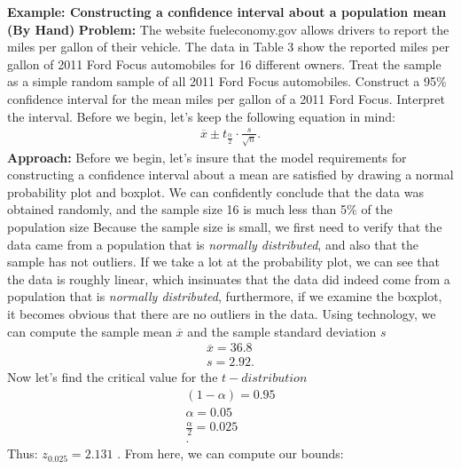 \documentclass{report}
\begin{document}
    \begin{mdframed}
      \textbf{Example: Constructing a confidence interval about a population mean (By Hand)}
      \bigbreak \noindent 
      \textbf{Problem:}
    The website fueleconomy.gov allows drivers to report the miles per gallon of their vehicle. The data in Table 3 show the reported miles per gallon of 2011 Ford Focus automobiles for 16 different owners. Treat the sample as a simple random sample of all 2011 Ford Focus automobiles. Construct a 95\% confidence interval for the mean miles per gallon of a 2011 Ford Focus. Interpret the interval.
      \bigbreak \noindent 
      Before we begin, let's keep the following equation in mind:
      \begin{align*}
          \overline{x} \pm t_{\frac{\alpha}{2}}\cdot \frac{s}{\sqrt{n}}
      .\end{align*}
      \bigbreak \noindent 
      \textbf{Approach:} Before we begin, let's insure that the model requirements for constructing a confidence interval about a mean are satisfied by drawing a normal probability plot and boxplot.
      \bigbreak \noindent 
      We can confidently conclude that the data was obtained randomly, and the sample size 16 is much less than 5\% of the population size
      \bigbreak \noindent 
      Because the sample size is small, we first need to verify that the data came from a population that is \textit{normally distributed}, and also that the sample has not outliers. If we take a lot at the probability plot, we can see that the data is roughly linear, which insinuates that the data did indeed come from a population that is \textit{normally distributed}, furthermore, if we examine the boxplot, it becomes obvious that there are no outliers in the data.
      \bigbreak \noindent 
      Using technology, we can compute the sample mean $\overline{x} $ and the sample standard deviation $s $
      \begin{align*}
          \overline{x} = 36.8 \\
           s = 2.92
      .\end{align*}
      \bigbreak \noindent 
      Now let's find the critical value for the $t-distribution$
      \begin{align*}
          (1-\alpha) = 0.95 \\
          \alpha = 0.05 \\
          \frac{\alpha}{2} = 0.025 \\
      .\end{align*}
      Thus: $z_{0.025} = 2.131$ \quad {}. From here, we can compute our bounds:

\end{mdframed}
\end{document}
